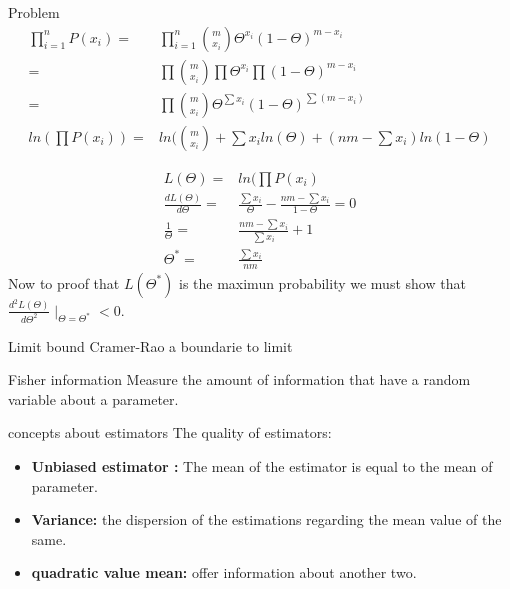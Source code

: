 \documentclass{beamer}
\begin{document}
\begin{frame}{Problem}
\begin{equation}
\begin{align*}
\prod_{i=1}^{n} P(x_{i})  = & \prod_{i=1}^{n} \binom{m}{x_{i}}\Theta^{x_{i}}(1-\Theta)^{m-x_{i}} \\
= & \prod \binom{m}{x_{i}} \prod \Theta^{x_{i}} \prod (1 -\Theta )^{m-x_{i}} \\
= & \prod \binom{m}{x_{i}} \Theta^{\sum x_{i}}(1-\Theta)^{\sum(m-x_{i})} \\
ln(\prod P(x_{i}) )= &ln(\binom{m}{x_{i}} + \sum x_{i} ln(\Theta) + (nm - \sum x_{i})ln(1-\Theta)
\end{align*}
\end{equation}
\end{frame}

\begin{frame}
\begin{equation}
\begin{align*}
L(\Theta) = &ln(\prod P(x_{i}) \\
\frac{dL(\Theta)}{d\Theta} = & \frac{\sum x_{i}}{\Theta} - \frac{nm-\sum x_{i}}{1-\Theta} = 0 
\\
\frac{1}{\Theta} = & \frac{nm-\sum x_{i}}{\sum x_{i}}+1 \\
\Theta^{*} = & \frac{\sum x_{i}}{nm}
\end{align*}
\end{equation}
Now to proof that $L(\Theta^{*})$ is the maximun probability we must show that $\frac{d^{2}L(\Theta)}{d\Theta^{2}} \mid_{\Theta=\Theta^{*}} <0.$ 
\end{frame}



\begin{frame}{Limit bound Cramer-Rao}
a boundarie to limit 

\end{frame}




\begin{frame}{Fisher information}
Measure the amount of information that have a random variable about a parameter. 

\end{frame}






\begin{frame}{concepts about estimators}
The quality of estimators:

\begin{itemize}
\item \textbf{Unbiased estimator
:}
The mean of the estimator is equal to the mean of parameter.

\item \textbf{Variance:}
the dispersion of the estimations regarding the mean value of the same.

\item \textbf{quadratic value mean:}
offer information about another two.
\end{itemize}
\end{frame}
\end{document}
